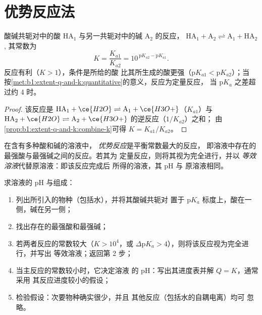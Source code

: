 \section{优势反应法}

\begin{proposition}[酸碱反应的常数]\label{prop:b1:predominant-reaction:k-of-reaction}
酸碱共轭对中的酸 $\mathrm{HA}_1$ 与另一共轭对中的碱
$\mathrm{A}_2$ 的反应，
$\mathrm{HA}_1 + \mathrm{A}_2 \rightleftharpoons \mathrm{A}_1 + \mathrm{HA}_2$,
其常数为
\[
  K = \frac{K_{a1}}{K_{a2}} = 10^{\,\mathrm{p}K_{a2} - \mathrm{p}K_{a1}} .
\]
反应有利（$K > 1$），条件是所给的酸
比其所生成的酸更强（$\mathrm{p}K_{a1} < \mathrm{p}K_{a2}$）；当
按\cref{met:b1:extent-q-and-k:quantitative}的意义，反应为定量反应，
当 $\mathrm{p}K_a$ 之差超过约 4 时。
\end{proposition}

\begin{proof}
该反应是 $\mathrm{HA}_1 + \ce{H2O} \rightleftharpoons
\mathrm{A}_1 + \ce{H3O+}$（$K_{a1}$）与 $\mathrm{HA}_2 +
\ce{H2O} \rightleftharpoons \mathrm{A}_2 + \ce{H3O+}$ 的逆反应（$1/K_{a2}$）之和；
由\cref{prop:b1:extent-q-and-k:combine-k}可得 $K = K_{a1}/K_{a2}$。
\end{proof}

\begin{definition}[优势反应与等效溶液]\label{def:b1:predominant-reaction:predominant-reaction}
在含有多种酸和碱的溶液中，
\emph{优势反应}是平衡常数最大的反应，
即溶液中存在的最强酸与最强碱之间的反应。若其为
定量反应，则将其视为完全进行，并以
\emph{等效溶液}代替原溶液：即该反应完成后
所得的溶液，其 pH 与
原溶液相同。
\end{definition}

\begin{method}[主反应方法]\label{met:b1:predominant-reaction:method}
求溶液的 pH 与组成：
\begin{enumerate}
  \item 列出所引入的物种（包括水），并将其酸碱共轭对
        置于 $\mathrm{p}K_a$ 标度上，酸在一侧，碱在另一侧；
  \item 找出存在的最强酸和最强碱；
  \item 若两者反应的常数较大（$K > 10^4$，或
        $\Delta\mathrm{p}K_a > 4$），则将该反应视为完全进行，并写出
        等效溶液；返回第 2 步；
  \item 当主反应的常数较小时，它决定溶液
        的 pH：写出其进度表并解 $Q = K$，通常采用
        其反应进度较小的假设；
  \item 检验假设：次要物种确实很少，并且
        其他反应（包括水的自耦电离）均可
        忽略。
\end{enumerate}
\end{method}

